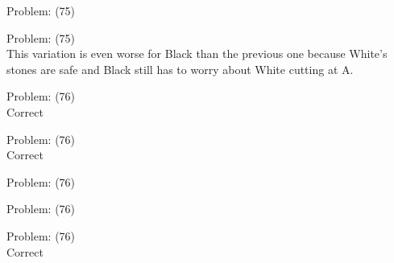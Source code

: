 \documentclass[11pt]{article}
\begin{document}
\begin{minipage}[t]{0.5\textwidth}
  {\centering
  
  Problem: (75)\\
  
  }
\end{minipage}
\begin{minipage}[t]{0.5\textwidth}
  {\centering
  
  Problem: (75)\\
  This variation is even worse for Black than the previous one because White's stones are safe and Black still has to worry about White cutting at A.\\
  }
\end{minipage}
\begin{minipage}[t]{0.5\textwidth}
  {\centering
  
  Problem: (76)\\
  Correct\\
  }
\end{minipage}
\begin{minipage}[t]{0.5\textwidth}
  {\centering
  
  Problem: (76)\\
  Correct\\
  }
\end{minipage}
\begin{minipage}[t]{0.5\textwidth}
  {\centering
  
  Problem: (76)\\
  
  }
\end{minipage}
\begin{minipage}[t]{0.5\textwidth}
  {\centering
  
  Problem: (76)\\
  
  }
\end{minipage}
\begin{minipage}[t]{0.5\textwidth}
  {\centering
  
  Problem: (76)\\
  Correct\\
  }
\end{minipage}
\end{document}
